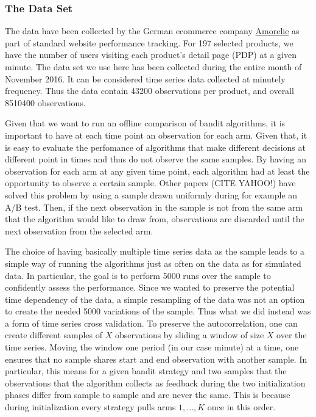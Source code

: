 \documentclass[12pt,]{article}
\begin{document}
\subsubsection{The Data Set}\label{the-data-set}

The data have been collected by the German ecommerce company
\href{https://amorelie.de}{Amorelie} as part of standard website
performance tracking. For 197 selected products, we have the number of
users visiting each product's detail page (PDP) at a given minute. The
data set we use here has been collected during the entire month of
November 2016. It can be considered time series data collected at
minutely frequency. Thus the data contain 43200 observations per
product, and overall 8510400 observations.

Given that we want to run an offline comparison of bandit algorithms, it
is important to have at each time point an observation for each arm.
Given that, it is easy to evaluate the perfomance of algorithms that
make different decisions at different point in times and thus do not
observe the same samples. By having an observation for each arm at any
given time point, each algorithm had at least the opportunity to observe
a certain sample. Other papers (CITE YAHOO!) have solved this problem by
using a sample drawn uniformly during for example an A/B test. Then, if
the next observation in the sample is not from the same arm that the
algorithm would like to draw from, observations are discarded until the
next observation from the selected arm.

The choice of having basically multiple time series data as the sample
leads to a simple way of running the algorithms just as often on the
data as for simulated data. In particular, the goal is to perform 5000
runs over the sample to confidently assess the performance. Since we
wanted to preserve the potential time dependency of the data, a simple
resampling of the data was not an option to create the needed 5000
variations of the sample. Thus what we did instead was a form of time
series cross validation. To preserve the autocorrelation, one can create
different samples of \(X\) observations by sliding a window of size
\(X\) over the time series. Moving the window one period (in our case
minute) at a time, one ensures that no sample shares start and end
observation with another sample. In particular, this means for a given
bandit strategy and two samples that the observations that the algorithm
collects as feedback during the two initialization phases differ from
sample to sample and are never the same. This is because during
initialization every strategy pulls arms \(1, ..., K\) once in this
order.
\end{document}
